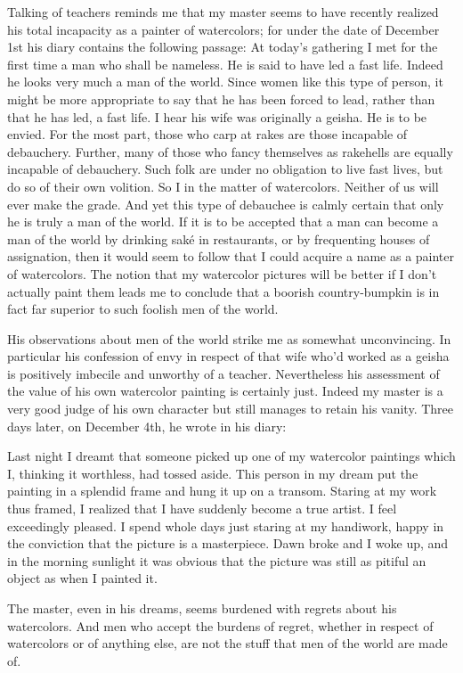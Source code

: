 \documentclass{book}
\begin{document}
Talking of teachers reminds me that my master seems to have recently
realized his total incapacity as a painter of watercolors; for under the
date of December 1st his diary contains the following passage: At
today's gathering I met for the first time a man who shall be nameless.
He is said to have led a fast life. Indeed he looks very much a man of
the world. Since women like this type of person, it might be more
appropriate to say that he has been forced to lead, rather than that he
has led, a fast life. I hear his wife was originally a geisha. He is to
be envied. For the most part, those who carp at rakes are those
incapable of debauchery. Further, many of those who fancy themselves as
rakehells are equally incapable of debauchery. Such folk are under no
obligation to live fast lives, but do so of their own volition. So I in
the matter of watercolors. Neither of us will ever make the grade. And
yet this type of debauchee is calmly certain that only he is truly a man
of the world. If it is to be accepted that a man can become a man of the
world by drinking saké in restaurants, or by frequenting houses of
assignation, then it would seem to follow that I could acquire a name as
a painter of watercolors. The notion that my watercolor pictures will be
better if I don't actually paint them leads me to conclude that a
boorish country-bumpkin is in fact far superior to such foolish men of
the world.

His observations about men of the world strike me as somewhat
unconvincing. In particular his confession of envy in respect of that
wife who'd worked as a geisha is positively imbecile and unworthy of a
teacher. Nevertheless his assessment of the value of his own watercolor
painting is certainly just. Indeed my master is a very good judge of his
own character but still manages to retain his vanity. Three days later,
on December 4th, he wrote in his diary:

Last night I dreamt that someone picked up one of my watercolor
paintings which I, thinking it worthless, had tossed aside. This person
in my dream put the painting in a splendid frame and hung it up on a
transom. Staring at my work thus framed, I realized that I have suddenly
become a true artist. I feel exceedingly pleased. I spend whole days
just staring at my handiwork, happy in the conviction that the picture
is a masterpiece. Dawn broke and I woke up, and in the morning sunlight
it was obvious that the picture was still as pitiful an object as when I
painted it.

The master, even in his dreams, seems burdened with regrets about his
watercolors. And men who accept the burdens of regret, whether in
respect of watercolors or of anything else, are not the stuff that men
of the world are made of.
\end{document}
